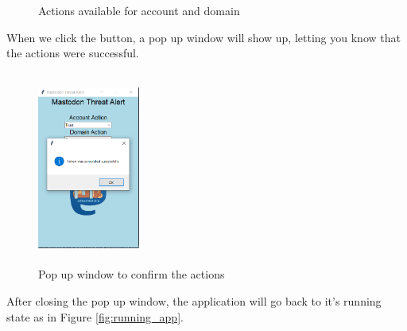 \begin{figure}[H]
	\centering
	\hspace{5pt}
	\caption{Actions available for account and domain}
	\label{fig:action_both}
\end{figure}
When we click the button, a pop up window will show up, letting
you know that the actions were successful.
\begin{figure}[H]
	\centering
	\includegraphics[width=0.3\textwidth,height=240px]{images/successaction.png}
	\caption{Pop up window to confirm the actions}
	\label{fig:pop_up_action}
\end{figure}
After closing the pop up window, the application will go back to
it's running state as in Figure \ref{fig:running_app}.

